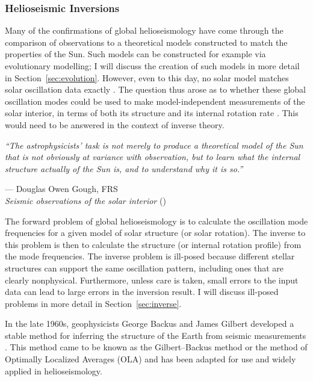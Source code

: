 \subsubsection*{Helioseismic Inversions}
Many of the confirmations of global helioseismology have come through the comparison of observations to a theoretical models constructed to match the properties of the Sun. %
Such models can be constructed for example via evolutionary modelling; I will discuss the creation of such models in more detail in Section~\ref{sec:evolution}. 
However, even to this day, no solar model matches solar oscillation data exactly \citep[e.g.,][]{1980Natur.288..544C}. 
The question thus arose as to whether these global oscillation modes could be used to make model-independent measurements of the solar interior, in terms of both its structure and its internal rotation rate \citep[e.g.,][]{1976Natur.259...89C, 1981MNRAS.196..731G}. 
This would need to be answered in the context of inverse theory. 

\epigraph{\emph{``The astrophysicists' task is not merely to produce a theoretical model of the Sun \hphantom{``}that is not obviously at variance with observation, but to learn what the internal \hphantom{``}structure actually of the Sun is, and to understand why it is so.''
}}{--- Douglas Owen Gough, FRS \\ 
\textit{Seismic observations of the solar interior} (\citeyear{1991ARA&A..29..627G})}

The forward problem of global helioseismology is to calculate the oscillation mode frequencies for a given model of solar structure (or solar rotation). 
The inverse to this problem is then to calculate the structure (or internal rotation profile) from the mode frequencies. 
The inverse problem is ill-posed because different stellar structures can support the same oscillation pattern, including ones that are clearly nonphysical. 
Furthermore, unless care is taken, small errors to the input data can lead to large errors in the inversion result. 
I will discuss ill-posed problems in more detail in Section~\ref{sec:inverse}. 

In the late 1960s, geophysicists George Backus and James Gilbert developed a stable method for inferring the structure of the Earth from seismic measurements  \citep{1968GeoJ...16..169B, 1970RSPTA.266..123B}. 
This method came to be known as the Gilbert--Backus method or the method of Optimally Localized Averages (OLA) and has been adapted for use and widely applied in helioseismology. %

